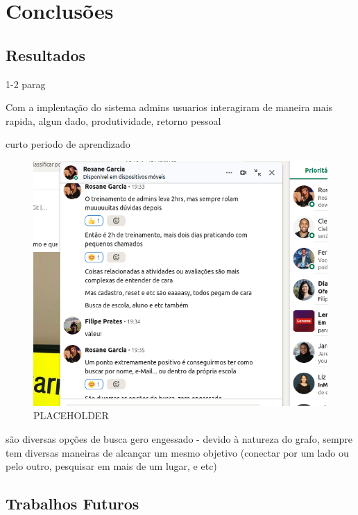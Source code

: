 \chapter{Conclusões}
\label{chap6}
 \section{Resultados}
1-2 parag

Com a implentação do sistema admins usuarios interagiram de maneira mais rapida, algun dado, produtividade, retorno pessoal

curto periodo de aprendizado 

\begin{figure}
    \centering
    \includegraphics[width=1\linewidth]{image.png}
    \caption{PLACEHOLDER }
    \label{fig:enter-label}
\end{figure}

são diversas opções de busca gero engessado - devido à natureza do grafo, sempre tem diversas maneiras de alcançar um mesmo objetivo (conectar por um lado ou pelo outro, pesquisar em mais de um lugar, e etc)

 \section{Trabalhos Futuros}

